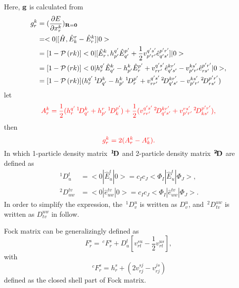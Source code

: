 \documentclass[a4paper,12pt,oneside]{book}
\newcommand{\red}[1]{{\color{red} #1}}
\newcommand{\perm}[1]{{\cal P}\left(#1\right)}
\newcommand{\pre}[1]{\,#1\!}
\begin{document}
Here, $\bf{g}$ is calculated from
\begin{equation}
\begin{aligned}
  g_r^k&= (\frac{\partial E}{\partial x_r^k})_{\bf{R = \bf{0}}}\\
  &= <0|[\hat{H}, \hat{E}^r_k-\hat{E}^k_r]|0>\\
  &= [1-\perm{rk}]<0|[\hat{E}^k_r, h^{q'}_{p'}\hat{E}^{p'}_{q'} + \frac{1}{2}v^{q's'}_{p'r'}\hat{e}^{p'r'}_{q's'}]|0>\\
  &= [1-\perm{rk}]<0|h^{q'}_r\hat{E}^k_{q'}-h^k_{p'}\hat{E}^{p'}_r +v^{q's'}_{rr'}\hat{e}^{kr'}_{q's'}- v^{ks'}_{p'r'}\hat{e}^{p'r'}_{rs'}|0>,\\
  &= [1-\perm{rk}](h^{q'}_r\pre{^1}D^k_{q'}-h^k_{p'}\pre{^1}D^{p'}_r+v^{q's'}_{rr'}\pre{^2}D^{kr'}_{q's'}-v^{ks'}_{p'r'}\pre{^2}D^{p'r'}_{rs'})
\end{aligned}
\end{equation}
let
\begin{equation}
  \red{A_r^k= \frac{1}{2}(h^{q'}_r\pre{^1}D^k_{q'} + h^r_{p'}\pre{^1}D^{p'}_k) + \frac{1}{2}(v^{q's'}_{rr'}\pre{^2}D^{kr'}_{q's'}+v^{rs'}_{p'r'}\pre{^2}D^{p'r'}_{ks'}),}
\end{equation}
then
\begin{equation}
  \red{g_r^k = 2(A_r^k-A_k^r).}
\end{equation}
In which 1-particle density matrix $\bf{\pre{^1}D}$ and 2-particle density matrix $\bf{\pre{^2}D}$ are defined as 
\begin{equation}
\begin{aligned}
  \pre{^1}D^t_u &= <0|\hat{E}^t_u|0> = c_Ic_J<\Phi_I|\hat{E}^t_u|\Phi_J>,\\
  \pre{^2}D^{tv}_{uw} &= <0|\hat{e}^{tv}_{uw}|0> = c_Ic_J<\Phi_I|\hat{e}^{tv}_{uw}|\Phi_J>.
\end{aligned}
\end{equation}
In order to simplify the expression, 
the $\pre{^1}D_v^u$ is written as $D_v^u$, and $\pre{^2}D_{tv}^{uw}$ is written as $D_{tv}^{uw}$ in follow. 

Fock matrix can be generalizingly defined as 
\begin{equation}
  F_r^s = \pre{^c}F_r^s + D^t_u[v^{su}_{rt}-\frac{1}{2}v^{us}_{rt}],
\end{equation}
with 
\begin{equation}
  \pre{^c}F_r^s = h^s_r+(2v^{sj}_{rj}-v^{js}_{rj})
\end{equation}
defined as the closed shell part of Fock matrix.
\end{document}
